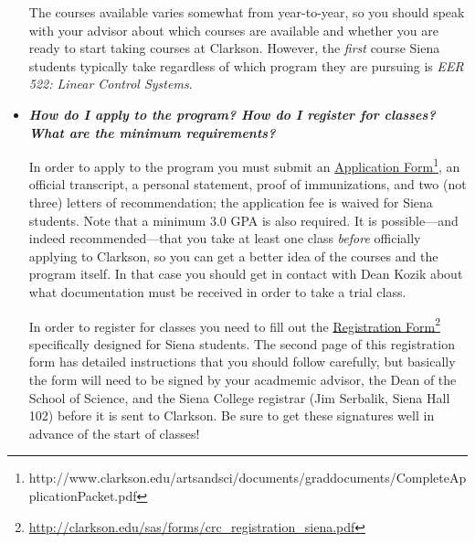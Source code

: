 \documentclass[12pt]{article}
\begin{document}
\begin{itemize}
{  The courses available varies somewhat from year-to-year, so you should speak
  with your advisor about which courses are available and whether you are ready
  to start taking courses at Clarkson.  However, the \emph{first} course Siena
  students typically take regardless of which program they are pursuing is {\em
    EER 522: Linear Control Systems}.}

%
  
\item{{\bf {\em How do I apply to the program?  How do I register for classes?
      What are the minimum requirements?}}

In order to apply to the program you must submit an \underline{Application
  Form}\footnote{http://www.clarkson.edu/artsandsci/documents/graddocuments/CompleteApplicationPacket.pdf},
an official transcript, a personal statement, proof of immunizations, and two
(not three) letters of recommendation; the application fee is waived for Siena
students.  Note that a minimum 3.0 GPA is also required.  It is possible---and
indeed recommended---that you take at least one class \emph{before} officially
applying to Clarkson, so you can get a better idea of the courses and the
program itself.  In that case you should get in contact with Dean Kozik about
what documentation must be received in order to take a trial class.  

In order to register for classes you need to fill out the
\underline{Registration
  Form}\footnote{\url{http://clarkson.edu/sas/forms/crc_registration_siena.pdf}}
specifically designed for Siena students.  The second page of this registration
form has detailed instructions that you should follow carefully, but basically
the form will need to be signed by your acadmemic advisor, the Dean of the
School of Science, and the Siena College registrar (Jim Serbalik, Siena Hall
102) before it is sent to Clarkson.  Be sure to get these signatures well in
advance of the start of classes!}


\end{itemize}
\end{document}
